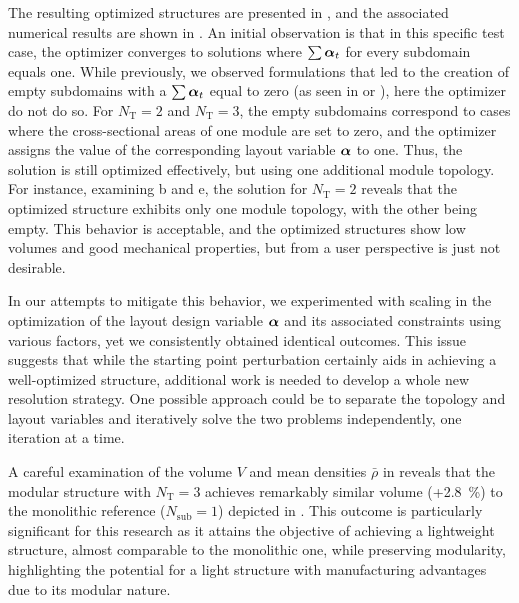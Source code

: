 The resulting optimized structures are presented in , and the associated numerical results are shown in . An initial observation is that in this specific test case, the optimizer converges to solutions where $\sum \bm{\alpha}_t$ for every subdomain equals one. While previously, we observed formulations that led to the creation of empty subdomains with a $\sum \bm{\alpha}_t$ equal to zero (as seen in  or ), here the optimizer do not do so. For $N_\text{T}=2$ and $N_\text{T}=3$, the empty subdomains correspond to cases where the cross-sectional areas of one module are set to zero, and the optimizer assigns the value of the corresponding layout variable $\bm{\alpha}$ to one. Thus, the solution is still optimized effectively, but using one additional module topology. For instance, examining b and e, the solution for $N_\text{T}=2$ reveals that the optimized structure exhibits only one module topology, with the other being empty. This behavior is acceptable, and the optimized structures show low volumes and good mechanical properties, but from a user perspective is just not desirable.

In our attempts to mitigate this behavior, we experimented with scaling in the optimization of the layout design variable $\bm{\alpha}$ and its associated constraints using various factors, yet we consistently obtained identical outcomes. This issue suggests that while the starting point perturbation certainly aids in achieving a well-optimized structure, additional work is needed to develop a whole new resolution strategy. One possible approach could be to separate the topology and layout variables and iteratively solve the two problems independently, one iteration at a time.

A careful examination of the volume $V$ and mean densities $\bar{\rho}$ in  reveals that the modular structure with $N_\text{T}=3$ achieves remarkably similar volume (+\qty{2.8}{\percent}) to the monolithic reference ($N_\text{sub}=1$) depicted in . This outcome is particularly significant for this research as it attains the objective of achieving a lightweight structure, almost comparable to the monolithic one, while preserving modularity, highlighting the potential for a light structure with manufacturing advantages due to its modular nature.

